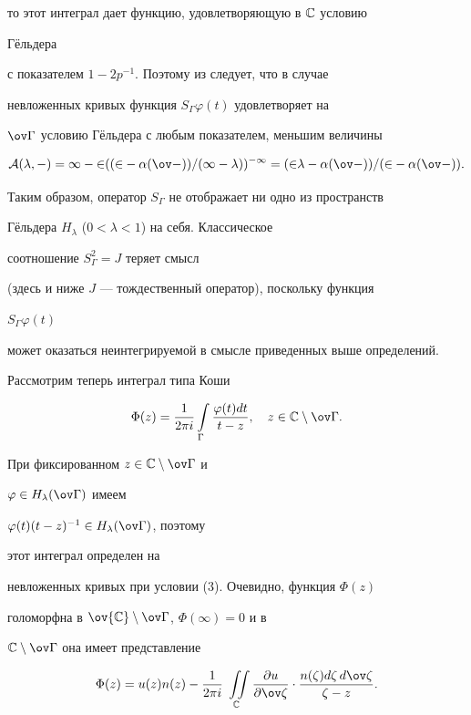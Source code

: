 то этот интеграл дает функцию, удовлетворяющую в $\Bbb C$ условию


Г\"ельдера


с показателем $1-2p^{-1}$. Поэтому из \cite{15} следует, что в случае


невложенных кривых функция $S_\Gamma\varphi(t)$ удовлетворяет на


$\ov\Gamma$ условию Г\"ельдера с любым показателем, меньшим величины


$$


\cal A(\lambda,\Gamma)=1-2((2-\alpha(\ov\Gamma))/(1-\lambda))^{-1}=


(2\lambda-\alpha(\ov\Gamma))/(2-\alpha(\ov\Gamma)).


$$


Таким образом, оператор $S_\Gamma$ не отображает ни одно из пространств


Г\"ельдера $H_\lambda$ ($0<\lambda<1$) на себя. Классическое


соотношение $S^2_\Gamma=J$ теряет смысл


(здесь и ниже $J$ --- тождественный оператор), поскольку функция


$S_\Gamma\varphi(t)$


может оказаться неинтегрируемой в смысле приведенных выше определений.





Рассмотрим теперь интеграл типа Коши


\begin{equation}


\Phi(z)=\frac{1}{2\pi i}\int\limits_\Gamma\frac{\varphi(t)dt}{t-z},


\quad z\in\Bbb C\setminus\ov\Gamma.


\end{equation}


При фиксированном $z\in\Bbb C\setminus\ov\Gamma$ и


$\varphi\in H_\lambda(\ov\Gamma)$ имеем


$\varphi(t)(t-z)^{-1}\in H_\lambda(\ov\Gamma)$, поэтому


этот интеграл определен на


невложенных кривых при условии (3). Очевидно, функция $\Phi(z)$


голоморфна в $\ov{\Bbb C}\setminus\ov\Gamma$, $\Phi(\infty)=0$ и в


$\Bbb C\setminus\ov\Gamma$ она имеет представление


\begin{equation}


\Phi(z)=u(z)n(z)-\frac{1}{2\pi i}\;


\iint\limits_{\Bbb C}\frac{\partial u}{\partial\ov\zeta}\cdot


\frac{n(\zeta)d\zeta\,d\ov\zeta}{\zeta-z}.


\end{equation}



